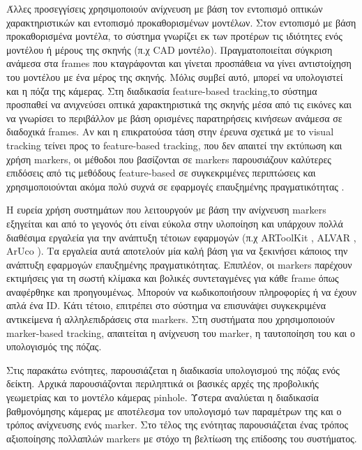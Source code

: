 Άλλες προσεγγίσεις χρησιμοποιούν ανίχνευση με βάση τον εντοπισμό οπτικών χαρακτηριστικών και εντοπισμό προκαθορισμένων μοντέλων. Στον εντοπισμό με βάση προκαθορισμένα μοντέλα, το σύστημα γνωρίζει εκ των προτέρων τις ιδιότητες ενός μοντέλου ή μέρους της σκηνής (π.χ CAD μοντέλο). Πραγματοποιείται σύγκριση ανάμεσα στα frames που κταγράφονται και γίνεται προσπάθεια να γίνει αντιστοίχηση του μοντέλου με ένα μέρος της σκηνής. Μόλις συμβεί αυτό, μπορεί να υπολογιστεί και η πόζα της κάμερας. Στη διαδικασία feature-based tracking,το σύστημα προσπαθεί να ανιχνεύσει οπτικά χαρακτηριστικά της σκηνής μέσα από τις εικόνες και να γνωρίσει το περιβάλλον με βάση ορισμένες παρατηρήσεις κινήσεων ανάμεσα σε διαδοχικά frames. Αν και η επικρατούσα τάση στην έρευνα σχετικά με το visual tracking τείνει προς το feature-based tracking, που δεν απαιτεί την εκτύπωση και χρήση markers, οι μέθοδοι που βασίζονται σε markers παρουσιάζουν καλύτερες επιδόσεις από τις μεθόδους feature-based σε συγκεκριμένες περιπτώσεις και χρησιμοποιούνται ακόμα πολύ συχνά σε εφαρμογές επαυξημένης πραγματικότητας \cite{wagner2008robust} \cite{rabbi2014applications} .


Η ευρεία χρήση συστημάτων που λειτουργούν με βάση την ανίχνευση markers εξηγείται και από το γεγονός ότι είναι εύκολα στην υλοποίηση και υπάρχουν πολλά διαθέσιμα εργαλεία για την ανάπτυξη τέτοιων εφαρμογών (π.χ ARToolKit \cite{artoolkit}, ALVAR \cite{alvar}, ArUco \cite{aruco}). Τα εργαλεία αυτά αποτελούν μία καλή βάση για να ξεκινήσει κάποιος την ανάπτυξη εφαρμογών επαυξημένης πραγματικότητας. Επιπλέον, οι markers παρέχουν εκτιμήσεις για τη σωστή κλίμακα και βολικές συντεταγμένες για κάθε frame όπως αναφέρθηκε και προηγουμένως. Μπορούν να κωδικοποιήσουν πληροφορίες ή να έχουν απλά ένα ID. Κάτι τέτοιο, επιτρέπει στο σύστημα να επισυνάψει συγκεκριμένα αντικείμενα ή αλληλεπιδράσεις στα markers. Στη συστήματα που χρησιμοποιούν marker-based tracking, απαιτείται η ανίχνευση του marker, η ταυτοποίηση του και ο υπολογισμός της πόζας. 

Στις παρακάτω ενότητες, παρουσιάζεται η διαδικασία υπολογισμού της πόζας ενός δείκτη. Αρχικά παρουσιάζονται περιληπτικά οι βασικές αρχές της προβολικής γεωμετρίας και το μοντέλο κάμερας pinhole. Ύστερα αναλύεται η διαδικασία βαθμονόμησης κάμερας με αποτέλεσμα τον υπολογισμό των παραμέτρων της και ο τρόπος ανίχνευσης ενός marker. Στο τέλος της ενότητας παρουσιάζεται ένας τρόπος αξιοποίησης πολλαπλών markers με στόχο τη βελτίωση της επίδοσης του συστήματος.





